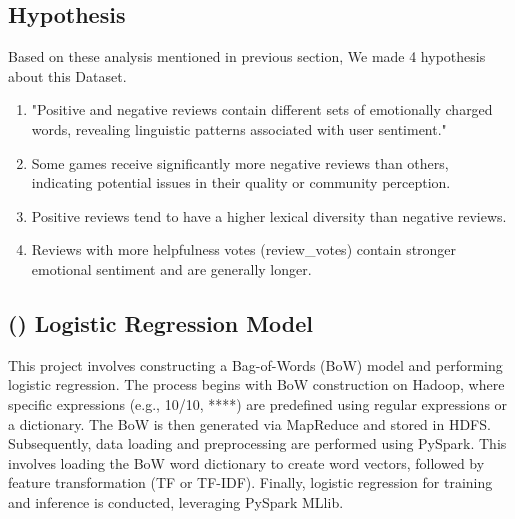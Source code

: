 \documentclass[a4paper,twocolumn,11pt]{article}
\begin{document}
\subsection{Hypothesis}
Based on these analysis mentioned in previous section, We made 4 hypothesis about this Dataset.
\begin{enumerate}
    \item "Positive and negative reviews contain different sets of emotionally charged words, revealing linguistic patterns associated with user sentiment."
    \item Some games receive significantly more negative reviews than others, indicating potential issues in their quality or community perception.
    \item Positive reviews tend to have a higher lexical diversity than negative reviews.
    \item Reviews with more helpfulness votes (review\_votes) contain stronger emotional sentiment and are generally longer.
\end{enumerate}

\subsection*{(\MakeUppercase{)}  Logistic Regression Model}
This project involves constructing a Bag-of-Words (BoW) model and performing logistic regression. The process begins with BoW construction on Hadoop, where specific expressions (e.g., 10/10, ****) are predefined using regular expressions or a dictionary. The BoW is then generated via MapReduce and stored in HDFS. Subsequently, data loading and preprocessing are performed using PySpark. This involves loading the BoW word dictionary to create word vectors, followed by feature transformation (TF or TF-IDF). Finally, logistic regression for training and inference is conducted, leveraging PySpark MLlib.
\end{document}
